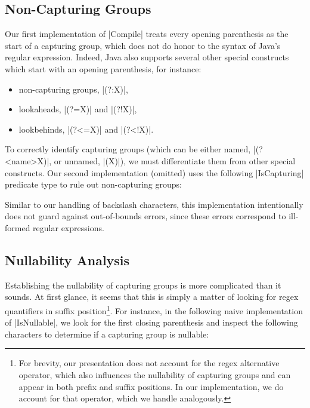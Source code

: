 \subsection{Non-Capturing Groups}

Our first implementation of |Compile| treats every opening parenthesis as the start of a capturing group, which does not do honor to the syntax of Java's regular expression.
Indeed, Java also supports several other special constructs which start with an opening parenthesis, for instance:

\begin{itemize}
  \item non-capturing groups, |(?:X)|,
  \item lookaheads, |(?=X)| and |(?!X)|,
  \item lookbehinds, |(?<=X)| and |(?<!X)|.
\end{itemize}

\noindent
To correctly identify capturing groups (which can be either named, |(?<name>X)|, or unnamed, |(X)|), we must differentiate them from other special constructs.
Our second implementation (omitted) uses the following |IsCapturing| predicate type to rule out non-capturing groups:

\regexIsCapturing

\noindent
Similar to our handling of backslash characters, this implementation intentionally does not guard against out-of-bounds errors, since these errors correspond to ill-formed regular expressions.

\subsection{Nullability Analysis}

Establishing the nullability of capturing groups is more complicated than it sounds.
At first glance, it seems that this is simply a matter of looking for regex quantifiers in suffix position\footnote{
For brevity, our presentation does not account for the regex alternative operator, which also influences the nullability of capturing groups and can appear in both prefix and suffix positions.
In our implementation, we do account for that operator, which we handle analogously.
}.
For instance, in the following naive implementation of |IsNullable|, we look for the first closing parenthesis and inspect the following characters to determine if a capturing group is nullable:

